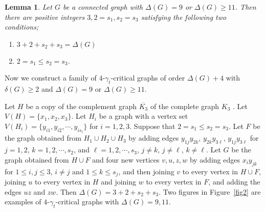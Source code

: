 \documentclass[12pt]{amsart}
\newtheorem{lem}[thm]{Lemma}
\begin{document}
\begin{lem} Let $G$ be a connected graph
  with $\Delta(G)=9$ or $\Delta(G)\geq 11$. Then there are positive integers  $3,2=s_{1},s_{2}= s_{3}$
  satisfying the following two conditions;
\begin{enumerate}
\item
 $ 3+ 2 +s_{2}+s_{3}=\Delta(G)$
\item
 $2 = s_{1}\leq s_{2} = s_{3}$.
\end{enumerate}\label{lem6}
\end{lem}
Now we  construct a family of $4$-$\gamma_{t}$-critical graphs  of
order $\Delta(G)+4$ with  $\delta(G)\geq 2$ and $\Delta(G)=9$ or
$\Delta(G)\geq 11$.

Let $H$ be a copy of the complement graph $\overline{K_{3}}$ of the complete graph $K_{3}$ . Let
$V(H)=\{x_1, x_2, x_3\}$. Let $H_{i}$ be a graph with
a vertex set  $V(H_{i})=\{y_{i1},y_{i2},\cdots,y_{is_{i}}\}$ for
$i=1,2,3$.  Suppose that  $2 = s_{1}\leq
s_{2}= s_{3}$.
Let $F$ be the graph obtained from $H_{1}\cup H_{2}\cup H_{3}$ by
adding edges $y_{1j}y_{2k}$, $y_{2k}y_{3\ell}$, $y_{1j}y_{3\ell}$ for
$j=1,2$, $k=1,2,\cdots,s_{2}$, and $\ell=1,2,\cdots,s_{3}$, $j\neq k$, $j\neq \ell$, $k\neq \ell$.
Let $G$ be the graph obtained from $H\cup F$  and four new vertices
$v,u,z,w$  by adding edges $x_i y_{jk}$ for $1\leq i,j\leq 3$,
$i\neq j$ and $1\leq k\leq s_{j}$, and then joining $v$ to every
vertex in $H\cup F$, joining $u$  to every vertex in $H$
and joining $w$ to every vertex in $F$, and adding the edges $uz$ and $zw$. Then $\Delta(G)=
3+2+s_{2}+s_{3}$. Two figures in Figure~\ref{fig2} are examples of $4$-$\gamma_{t}$-critical graphs with $\Delta(G)= 9, 11$.
\end{document}
